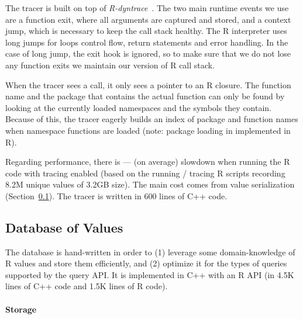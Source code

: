 \documentclass[sigplan,anonymous,review]{acmart}
\begin{document}
The tracer is built on top of \emph{R-dyntrace}~\cite{goel2019}.
The two main runtime events we use are a function exit, where all arguments are captured and stored, and a context jump, which is necessary to keep the call stack healthy.
The R interpreter uses long jumps for loops control flow, return statements and error handling.
In the case of long jump, the exit hook is ignored, so to make sure that we do not lose any function exits we maintain our version of R call stack.

When the tracer sees a call, it only sees a pointer to an R closure.
The function name and the package that contains the actual function can only be found by looking at the currently loaded namespaces and the symbols they contain.
Because of this, the tracer eagerly builds an index of package and function names when namespace functions are loaded (note: package loading in implemented in R).

Regarding performance, there is \TRMinTracingOverhead --- \TRMaxTracingOverhead (\TRAvgTracingOverhead on average) slowdown when running the R code with tracing enabled (based on the running / tracing \TRTracingFiles R scripts recording 8.2M unique values of 3.2GB size).
The main cost comes from value serialization (\Cf Section~\ref{sec:sxpdb}).
The tracer is written in 600 lines of C++ code.

\subsection{Database of Values}\label{sec:sxpdb}

The database is hand-written in order to (1) leverage some domain-knowledge of R values and store them efficiently, and (2) optimize it for the types of queries supported by the query API.
It is implemented in C++ with an R API (in 4.5K lines of C++ code and 1.5K lines of R code).

\paragraph{Storage}
\end{document}
